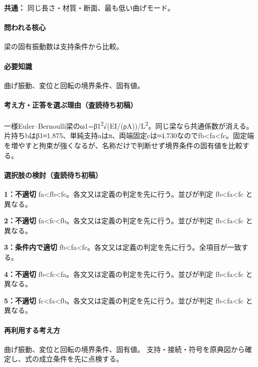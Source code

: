 \noindent\textbf{共通：} 同じ長さ・材質・断面、最も低い曲げモード。\par

\paragraph{問われる核心} 梁の固有振動数は支持条件から比較。

\paragraph{必要知識} 曲げ振動、変位と回転の境界条件、固有値。

\paragraph{考え方・正答を選ぶ理由（査読待ち初稿）} 一様Euler–Bernoulli梁のω1=β1\textsuperscript{2}√(EI/(ρA))/L\textsuperscript{2}。同じ梁なら共通係数が消える。片持ちbはβ1≈1.875、単純支持aはπ、両端固定cは≈4.730なのでfb<fa<fc。固定端を増やすと拘束が強くなるが、名称だけで判断せず境界条件の固有値を比較する。

\paragraph{選択肢の検討（査読待ち初稿）}\mbox{}\par

\noindent\textbf{1：不適切} fa<fb<fc。各文又は定義の判定を先に行う。並びが判定 fb<fa<fc と異なる。\par

\noindent\textbf{2：不適切} fa<fc<fb。各文又は定義の判定を先に行う。並びが判定 fb<fa<fc と異なる。\par

\noindent\textbf{3：条件内で適切} fb<fa<fc。各文又は定義の判定を先に行う。全項目が一致する。\par

\noindent\textbf{4：不適切} fb<fc<fa。各文又は定義の判定を先に行う。並びが判定 fb<fa<fc と異なる。\par

\noindent\textbf{5：不適切} fc<fa<fb。各文又は定義の判定を先に行う。並びが判定 fb<fa<fc と異なる。\par

\paragraph{再利用する考え方} 曲げ振動、変位と回転の境界条件、固有値。 支持・接続・符号を原典図から確定し、式の成立条件を先に点検する。

